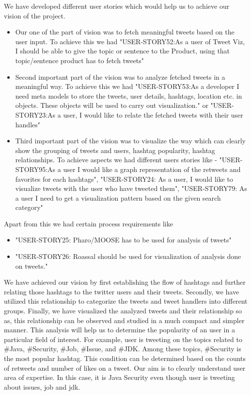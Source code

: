 \documentclass[11pt]{article}
\begin{document}
We have developed different user stories which would help us to achieve our vision of the project. 

\begin{itemize}
\item Our one of the part of vision was to fetch meaningful tweets based on the user input. To achieve this we had "USER-STORY52:As a user of Tweet Viz, I should be able to give the topic or sentence to the Product, using that topic/sentence product has to fetch tweets"

\item Second important part of the vision was to analyze fetched tweets in a meaningful way. To achieve this we had "USER-STORY53:As a developer I need meta models to store the tweets, user details, hashtags, location etc. in objects. These objects will be used to carry out visualization." or "USER-STORY23:As a user, I would like to relate the fetched tweets with their user handles"

\item Third important part of the vision was to visualize the way which can clearly show the grouping of tweets and users, hashtag popularity, hashtag relationships. To achieve aspects we had different users stories like - "USER-STORY95:As a user I would like a graph representation of the retweets and favorites for each hashtags", "USER-STORY24: As a user, I would like to visualize tweets with the user who have tweeted them", "USER-STORY79: As a user I need to get a visualization pattern based on the given search category"

\end{itemize}

Apart from this we had certain process requirements like

\begin{itemize}
\item "USER-STORY25: Pharo/MOOSE has to be used for analysis of tweets"
\item "USER-STORY26: Roassal should be used for visualization of analysis done on tweets."
\end{itemize}

We have achieved our vision by first establishing the flow of hashtags and further relating those hashtags to the twitter users and their tweets. Secondly, we have utilized this relationship to categorize the tweets and tweet handlers into different groups. Finally, we have visualized the analyzed tweets and their relationship so as, this relationship can be observed and studied in a much compact and simpler manner.
This analysis will help us to determine the popularity of an user in a particular field of interest. For example, user is tweeting on the topics related to \#Java, \#Security, \#Job, \#Issue, and \#JDK. Among these topics, \#Security is the most popular hashtag. This condition can be determined based on the counts of retweets and number of likes on a tweet. Our aim is to clearly understand user area of expertise. In this case, it is Java Security even though user is tweeting about issues, job and jdk.
\end{document}
